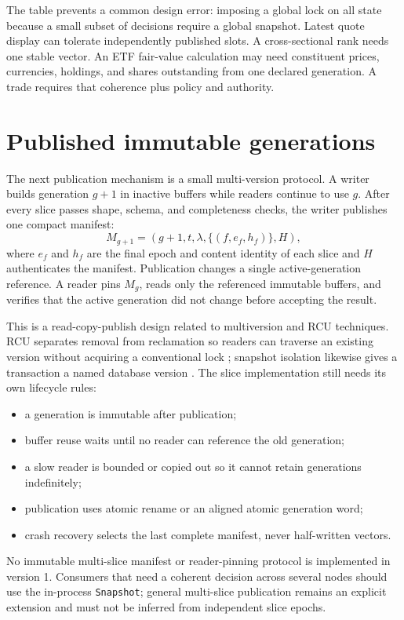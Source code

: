 \documentclass{strategynet-journal}
\begin{document}
The table prevents a common design error: imposing a global lock on all state
because a small subset of decisions require a global snapshot.  Latest quote
display can tolerate independently published slots.  A cross-sectional rank
needs one stable vector.  An ETF fair-value calculation may need constituent
prices, currencies, holdings, and shares outstanding from one declared
generation.  A trade requires that coherence plus policy and authority.

\section{Published immutable generations}

The next publication mechanism is a small multi-version protocol.  A writer builds
generation \(g+1\) in inactive buffers while readers continue to use \(g\).
After every slice passes shape, schema, and completeness checks, the writer
publishes one compact manifest:
\[
  M_{g+1}=(g+1,t,\lambda,\{(f,e_f,h_f)\},H),
\]
where \(e_f\) and \(h_f\) are the final epoch and content identity of each
slice and \(H\) authenticates the manifest.  Publication changes a single
active-generation reference.  A reader pins \(M_g\), reads only the referenced
immutable buffers, and verifies that the active generation did not change
before accepting the result.

This is a read-copy-publish design related to multiversion and RCU techniques.
RCU separates removal from reclamation so readers can traverse an existing
version without acquiring a conventional lock \cite{rcu}; snapshot isolation
likewise gives a transaction a named database version \cite{snapshot}.  The
slice implementation still needs its own lifecycle rules:
\begin{itemize}
  \item a generation is immutable after publication;
  \item buffer reuse waits until no reader can reference the old generation;
  \item a slow reader is bounded or copied out so it cannot retain generations
        indefinitely;
  \item publication uses atomic rename or an aligned atomic generation word;
  \item crash recovery selects the last complete manifest, never half-written
        vectors.
\end{itemize}

No immutable multi-slice manifest or reader-pinning protocol is implemented in
version 1.  Consumers that need a coherent decision across several nodes
should use the in-process \texttt{Snapshot}; general multi-slice publication
remains an explicit extension and must not be inferred from independent slice
epochs.
\end{document}
